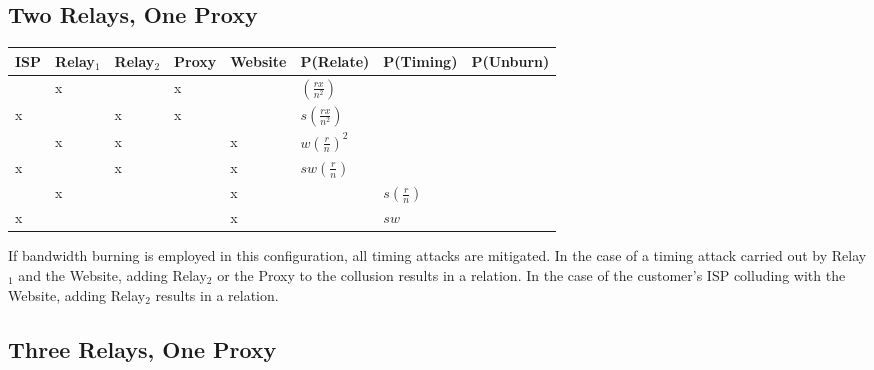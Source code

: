 \subsection{Two Relays, One Proxy}


\begin{center}
\begin{tabular}{l | l | l | l | l | l | l | l}
  ISP & Relay$_1$ & Relay$_2$ & Proxy & Website & P(Relate)           & P(Timing) & P(Unburn) \\
  \hline
      & x         &           & x     &         & $(\frac{rx}{n^2})$  &           & \\
  \hline
  x   &           & x         & x     &         & $s(\frac{rx}{n^2})$ &           & \\
  \hline
      & x         & x         &       & x       & $w(\frac{r}{n})^2$  &           & \\
  \hline
  x   &           & x         &       & x       & $sw(\frac{r}{n})$   &           & \\
  \hline
      & x         &           &       & x       &                     & $s(\frac{r}{n})$ & \\
  \hline
  x   &           &           &       & x       &                     & $sw$      & \\
\end{tabular}
\end{center}

If bandwidth burning is employed in this configuration, all timing
attacks are mitigated. In the case of a timing attack carried out by
Relay$_1$ and the Website, adding Relay$_2$ or the Proxy to the
collusion results in a relation. In the case of the customer's ISP
colluding with the Website, adding Relay$_2$ results in a relation.

\subsection{Three Relays, One Proxy}


